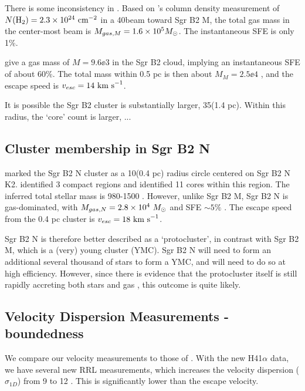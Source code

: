 \documentclass[twocolumn]{aastex61}
\begin{document}
{\color{red} There is some inconsistency in \citet{Schmiedeke2016a}.}
Based on \citet{Schmiedeke2016a}'s column density measurement of $N(\textrm{H}_{2})=2.3\times10^{24}~\textrm{cm}^{-2}$
in a 40\arcsec beam toward Sgr B2 M, the total gas mass in the center-most beam is
$M_{gas, M} = 1.6\times10^{5} M_{\odot}$.  The instantaneous SFE is only 1\%.

\citet{Schmiedeke2016a} give a gas mass of $M=9.6\ee{3}$ \msun in the Sgr B2
cloud, implying an instantaneous SFE of about 60\%.  The total mass within 0.5
pc is then about $M_M = 2.5\ee{4}$ \msun, and the escape speed is
$v_{esc}=14~\textrm{km~s}^{-1}$.



It is possible the Sgr B2 cluster is substantially larger, 35\arcsec (1.4 pc).
Within this radius, the `core' count is larger, ...

\subsection{Cluster membership in Sgr B2 N}
\citet{Schmiedeke2016a} marked the Sgr B2 N cluster as a 10\arcsec  (0.4 pc) radius circle
centered on Sgr B2 N K2.  \citet{Schmiedeke2016a} identified 3 compact \hii regions
and \citet{Ginsburg2017c} identified 11 cores within this region.  The inferred
total stellar mass is 980-1500 \msun.  However, unlike Sgr B2 M, Sgr B2 N
is gas-dominated, with $M_{gas,N} = 2.8\times10^{4}~M_{\odot}$ and SFE $\sim5\%$ \citep{Schmiedeke2016a}.
The escape speed from the 0.4 pc cluster is $v_{esc} = 18~\textrm{km~s}^{-1}$.

Sgr B2 N is therefore better described as a `protocluster', in contrast with
Sgr B2 M, which is a (very) young cluster (YMC).  Sgr B2 N will need to form an
additional several thousand \msun of stars to form a YMC, and will need to do
so at high efficiency.  However, since there is evidence that the protocluster
itself is still rapidly accreting both stars and gas \citep[][cite myself?]{},
this outcome is quite likely.


\subsection{Velocity Dispersion Measurements - boundedness}

We compare our velocity measurements to those of \citet{De-Pree2011a}.
With the new H41$\alpha$ data, we have several new RRL measurements, which increases the velocity dispersion ($\sigma_{1D}$)
from 9 \kms to 12 \kms.  This is significantly lower than the escape velocity.
\end{document}
